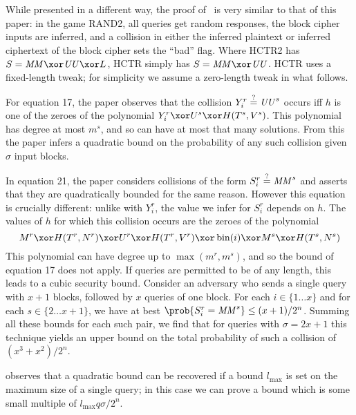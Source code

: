\documentclass[hctr2.tex]{subfiles}
\begin{document}
While presented in a different way, 
the proof of~\cite{hctrquad} is very similar
to that of this paper: in the game RAND2, all queries get random
responses, the block cipher inputs are inferred, and a collision
in either the inferred plaintext or inferred ciphertext of the block cipher
sets the ``bad'' flag.  
Where HCTR2 has \(S = \MM \xor \UU \xor L\),
HCTR simply has \(S = \MM \xor \UU\). 
HCTR uses a fixed-length tweak;
for simplicity we assume a zero-length tweak in what follows.

For equation 17, the paper observes that the collision
\(Y_i^r \stackrel{\text{?}}{=} \mathit{UU}^s\) occurs iff \(h\) is one of the zeroes
of the polynomial \(Y_i^r \xor U^s \xor H(T^s, V^s)\).
This polynomial has degree at most
\(m^s\), and so can have
at most that many solutions. From this the paper infers
a quadratic bound on the probability of any such collision
given \(\sigma\) input blocks.

In equation 21, the paper considers collisions of the form 
\(S_i^r \stackrel{\text{?}}{=} \mathit{MM}^s\) and asserts that they are
quadratically bounded for the same reason. However this equation
is crucially different: unlike with \(Y_i^r\), the value we
infer for \(S_i^r\) depends on \(h\). The values of \(h\)
for which this collision occurs are
the zeroes of the polynomial
\begin{displaymath}
    M^r \xor H(T^r, N^r)
    \xor U^r \xor H(T^r, V^r) \xor \fromint(i) 
    \xor M^s \xor H(T^s, N^s)        
\end{displaymath}
This polynomial can have degree up to 
\(\max(m^r, m^s)\), and so the bound of
equation 17 does not apply.
If queries are permitted to be of any length,
this leads to a cubic security bound.
Consider an adversary who
sends a single query with \(x+1\) blocks, followed by
\(x\) queries of one block. For each \(i \in \{1\ldots x\}\) and
for each \(s \in \{2 \ldots x + 1\}\), we have at best
\(\prob{S_i^r = \MM^s} \leq (x + 1)/2^n\). Summing
all these bounds for each such pair, we find that
for queries with \(\sigma = 2x + 1\)
this technique yields an upper bound on 
the total probability of such a collision of
\((x^3 + x^2)/2^n\).

\cite{nandimail} observes that a quadratic bound can be recovered
if a bound \(l_\mathrm{max}\) is set on the maximum size of
a single query; in this case we can prove a bound
which is some small multiple of \(l_\mathrm{max}q\sigma/2^n\).
\end{document}
